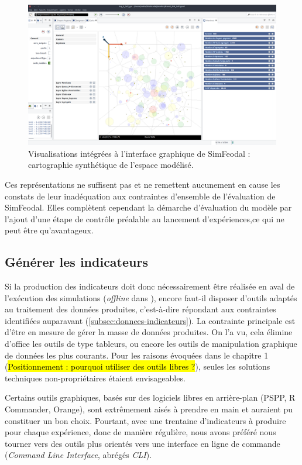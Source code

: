 \begin{figure}[H]
	\captionsetup{width=\linewidth}
	\includegraphics[width=\linewidth]{img/SimFeodal_GUI_carte.png}
	\caption{Visualisations intégrées à l'interface graphique de SimFeodal : cartographie synthétique de l'espace modélisé.}
	\label{fig:simfeodal_gui_carte}
\end{figure}

	Ces représentations ne suffisent pas et ne remettent aucunement en cause les constats de leur inadéquation aux contraintes d'ensemble de l'évaluation de SimFeodal.
	Elles complètent cependant la démarche d'évaluation du modèle par l'ajout d'une étape de contrôle préalable au lancement d'expériences,ce qui ne peut être qu'avantageux.

	\subsection{Générer les indicateurs}

	Si la production des indicateurs doit donc nécessairement être réalisée en aval de l'exécution des simulations (\textit{offline} dans \cite{grignard_agent-based_2017}), encore faut-il disposer d'outils adaptés au traitement des données produites, c'est-à-dire répondant aux contraintes identifiées auparavant (\autoref{subsec:donnees-indicateurs}).
	La contrainte principale est d'être en mesure de gérer la masse de données produites.
	On l'a vu, cela élimine d'office les outils de type tableurs, ou encore les outils de manipulation graphique de données les plus courants.
	Pour les raisons évoquées dans le chapitre 1 (\hl{Positionnement : pourquoi utiliser des outils libres ?}), seules les solutions techniques non-propriétaires étaient envisageables.

	Certains outils graphiques, basés sur des logiciels libres en arrière-plan (PSPP, R Commander, Orange), sont extrêmement aisés à prendre en main et auraient pu constituer un bon choix.
	Pourtant, avec une trentaine d'indicateurs à produire pour chaque expérience, donc de manière régulière, nous avons préféré nous tourner vers des outils plus orientés vers une interface en ligne de commande (\textit{Command Line Interface}, abrégés \textit{CLI}).


